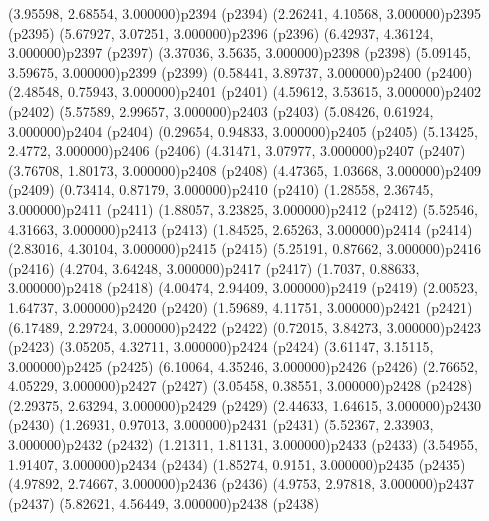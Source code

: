\psPoint(3.95598, 2.68554, 3.000000){p2394}
\psdot(p2394)
\psPoint(2.26241, 4.10568, 3.000000){p2395}
\psdot(p2395)
\psPoint(5.67927, 3.07251, 3.000000){p2396}
\psdot(p2396)
\psPoint(6.42937, 4.36124, 3.000000){p2397}
\psdot(p2397)
\psPoint(3.37036, 3.5635, 3.000000){p2398}
\psdot(p2398)
\psPoint(5.09145, 3.59675, 3.000000){p2399}
\psdot(p2399)
\psPoint(0.58441, 3.89737, 3.000000){p2400}
\psdot(p2400)
\psPoint(2.48548, 0.75943, 3.000000){p2401}
\psdot(p2401)
\psPoint(4.59612, 3.53615, 3.000000){p2402}
\psdot(p2402)
\psPoint(5.57589, 2.99657, 3.000000){p2403}
\psdot(p2403)
\psPoint(5.08426, 0.61924, 3.000000){p2404}
\psdot(p2404)
\psPoint(0.29654, 0.94833, 3.000000){p2405}
\psdot(p2405)
\psPoint(5.13425, 2.4772, 3.000000){p2406}
\psdot(p2406)
\psPoint(4.31471, 3.07977, 3.000000){p2407}
\psdot(p2407)
\psPoint(3.76708, 1.80173, 3.000000){p2408}
\psdot(p2408)
\psPoint(4.47365, 1.03668, 3.000000){p2409}
\psdot(p2409)
\psPoint(0.73414, 0.87179, 3.000000){p2410}
\psdot(p2410)
\psPoint(1.28558, 2.36745, 3.000000){p2411}
\psdot(p2411)
\psPoint(1.88057, 3.23825, 3.000000){p2412}
\psdot(p2412)
\psPoint(5.52546, 4.31663, 3.000000){p2413}
\psdot(p2413)
\psPoint(1.84525, 2.65263, 3.000000){p2414}
\psdot(p2414)
\psPoint(2.83016, 4.30104, 3.000000){p2415}
\psdot(p2415)
\psPoint(5.25191, 0.87662, 3.000000){p2416}
\psdot(p2416)
\psPoint(4.2704, 3.64248, 3.000000){p2417}
\psdot(p2417)
\psPoint(1.7037, 0.88633, 3.000000){p2418}
\psdot(p2418)
\psPoint(4.00474, 2.94409, 3.000000){p2419}
\psdot(p2419)
\psPoint(2.00523, 1.64737, 3.000000){p2420}
\psdot(p2420)
\psPoint(1.59689, 4.11751, 3.000000){p2421}
\psdot(p2421)
\psPoint(6.17489, 2.29724, 3.000000){p2422}
\psdot(p2422)
\psPoint(0.72015, 3.84273, 3.000000){p2423}
\psdot(p2423)
\psPoint(3.05205, 4.32711, 3.000000){p2424}
\psdot(p2424)
\psPoint(3.61147, 3.15115, 3.000000){p2425}
\psdot(p2425)
\psPoint(6.10064, 4.35246, 3.000000){p2426}
\psdot(p2426)
\psPoint(2.76652, 4.05229, 3.000000){p2427}
\psdot(p2427)
\psPoint(3.05458, 0.38551, 3.000000){p2428}
\psdot(p2428)
\psPoint(2.29375, 2.63294, 3.000000){p2429}
\psdot(p2429)
\psPoint(2.44633, 1.64615, 3.000000){p2430}
\psdot(p2430)
\psPoint(1.26931, 0.97013, 3.000000){p2431}
\psdot(p2431)
\psPoint(5.52367, 2.33903, 3.000000){p2432}
\psdot(p2432)
\psPoint(1.21311, 1.81131, 3.000000){p2433}
\psdot(p2433)
\psPoint(3.54955, 1.91407, 3.000000){p2434}
\psdot(p2434)
\psPoint(1.85274, 0.9151, 3.000000){p2435}
\psdot(p2435)
\psPoint(4.97892, 2.74667, 3.000000){p2436}
\psdot(p2436)
\psPoint(4.9753, 2.97818, 3.000000){p2437}
\psdot(p2437)
\psPoint(5.82621, 4.56449, 3.000000){p2438}
\psdot(p2438)
